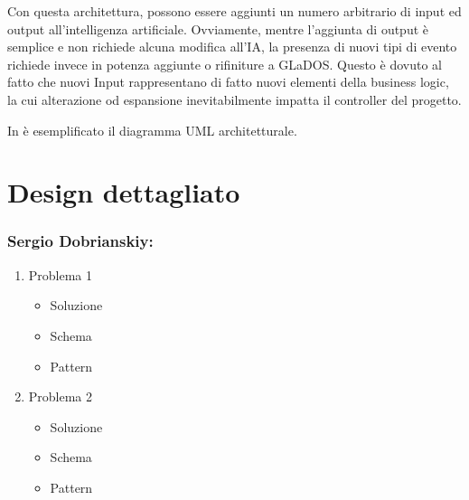 \documentclass[a4paper,12pt]{report}
\begin{document}
Con questa architettura, possono essere aggiunti un numero arbitrario di input ed output
all'intelligenza artificiale.
%
Ovviamente, mentre l'aggiunta di output è semplice e non richiede alcuna modifica all'IA, la
presenza di nuovi tipi di evento richiede invece in potenza aggiunte o rifiniture a GLaDOS.
%
Questo è dovuto al fatto che nuovi Input rappresentano di fatto nuovi elementi della business
logic, la cui alterazione od espansione inevitabilmente impatta il controller del progetto.

In  è esemplificato il diagramma UML architetturale.


\section{Design dettagliato}

\subsubsection*{Sergio Dobrianskiy:}
%
\begin{enumerate}
	\item Problema 1
	\begin{itemize}
		\item Soluzione
		\item Schema
		\item Pattern
	\end{itemize}
	\item Problema 2
	\begin{itemize}
		\item Soluzione
		\item Schema
		\item Pattern
	\end{itemize}
\end{enumerate}
%
\end{document}
